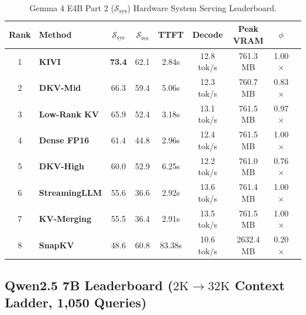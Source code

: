 \documentclass[10pt]{article}
\theoremstyle{definition}
\begin{document}
\begin{table}[h]
\vspace{6pt}
\centering
\small
\caption{Gemma 4 E4B Part 2 ($\mathcal{S}_{\text{sys}}$) Hardware System Serving Leaderboard.}
\label{tab:e4b_ssys}
\begin{tabular}{clccccccc}
\toprule
\textbf{Rank} & \textbf{Method} & $\mathcal{S}_{\text{sys}}$ & $\mathcal{S}_{\text{res}}$ & \textbf{TTFT} & \textbf{Decode} & \textbf{Peak VRAM} & $\phi$ \\
\midrule
1 & \textbf{KIVI} & \textbf{73.4} & 62.1 & 2.84s & 12.8 tok/s & 761.3 MB & 1.00$\times$ \\
2 & \textbf{DKV-Mid} & 66.3 & 59.4 & 5.06s & 12.3 tok/s & 760.7 MB & 0.83$\times$ \\
3 & \textbf{Low-Rank KV} & 65.9 & 52.4 & 3.18s & 13.1 tok/s & 761.5 MB & 0.97$\times$ \\
4 & \textbf{Dense FP16} & 61.4 & 44.8 & 2.96s & 12.4 tok/s & 761.5 MB & 1.00$\times$ \\
5 & \textbf{DKV-High} & 60.0 & 52.9 & 6.25s & 12.2 tok/s & 761.0 MB & 0.76$\times$ \\
6 & \textbf{StreamingLLM} & 55.6 & 36.6 & 2.92s & 13.6 tok/s & 761.4 MB & 1.00$\times$ \\
7 & \textbf{KV-Merging} & 55.5 & 36.4 & 2.91s & 13.5 tok/s & 761.5 MB & 1.00$\times$ \\
8 & \textbf{SnapKV} & 48.6 & 60.8 & 83.38s & 10.6 tok/s & 2632.4 MB & 0.20$\times$ \\
\bottomrule
\end{tabular}
\end{table}

\clearpage
\subsection{Qwen2.5 7B Leaderboard (\texorpdfstring{$2\text{K} \to 32\text{K}$}{2K to 32K} Context Ladder, 1,050 Queries)}
\end{document}
